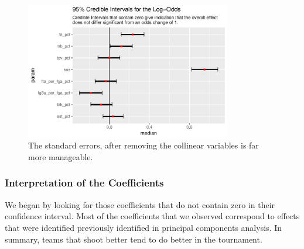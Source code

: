 \documentclass[10pt,a4paper, hidelinks]{article} %
\begin{document}
\begin{figure}[H]
	\centering
	
\end{figure}

\begin{figure}[H]
	\centering
	\includegraphics[height=6cm]{../fig/polr_coef}
	\caption{The standard errors, after removing the collinear variables is far more manageable.}
	\label{fig:polr_coef}
\end{figure}


\subsubsection{Interpretation of the Coefficients}

We began by looking for those coefficients that do not contain zero in their confidence interval. Most of the coefficients that we observed correspond to effects that were identified previously identified in principal components analysis. In summary, teams that shoot better tend to do better in the tournament. 
\end{document}
